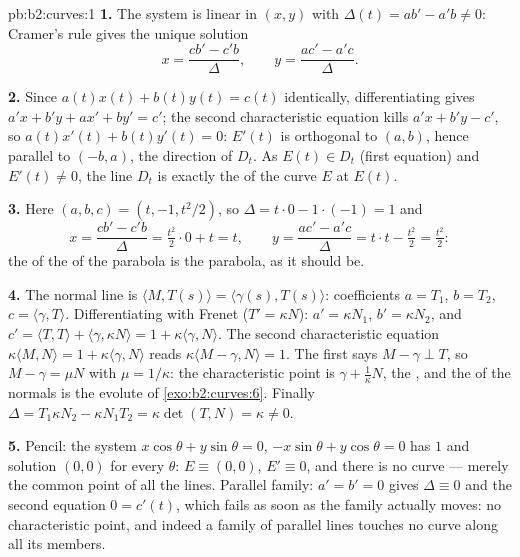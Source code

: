 \begin{solution}{pb:b2:curves:1}
\textbf{1.} The system is linear in $(x, y)$ with 
$\Delta(t) = a b' - a'b \neq 0$: Cramer's rule gives the
unique solution
\[
x = \frac{c b' - c' b}{\Delta}, \qquad
y = \frac{a c' - a' c}{\Delta}.
\]

\textbf{2.} Since $a(t)x(t) + b(t)y(t) = c(t)$ identically,
differentiating gives $a'x + b'y + ax' + by' = c'$; the
second characteristic equation kills $a'x + b'y - c'$, so
$a(t)x'(t) + b(t)y'(t) = 0$: $E'(t)$ is orthogonal to $(a,
b)$, hence parallel to $(-b, a)$, the direction of $D_t$. As
$E(t) \in D_t$ (first equation) and $E'(t) \neq 0$, the line
$D_t$ is exactly the  of the curve $E$ at $E(t)$.

\textbf{3.} Here $(a, b, c) = (t, -1, t^2/2)$, so $\Delta =
t\cdot0 - 1\cdot(-1) = 1$ and
\[
x = \frac{c b' - c' b}{\Delta} = \tfrac{t^2}2\cdot 0 +
t = t, \qquad
y = \frac{a c' - a' c}{\Delta} = t\cdot t - \tfrac{t^2}2 =
\tfrac{t^2}2 :
\]
the  of the  of the parabola is the
parabola, as it should be.

\textbf{4.} The normal line is $\langle M, T(s)\rangle =
\langle\gamma(s), T(s)\rangle$: coefficients $a = T_1$, $b =
T_2$, $c = \langle\gamma, T\rangle$. Differentiating with
Frenet ($T' = \kappa N$): $a' = \kappa N_1$, $b' = \kappa
N_2$, and $c' = \langle T, T\rangle + \langle\gamma, \kappa
N\rangle = 1 + \kappa\langle\gamma, N\rangle$. The second
characteristic equation $\kappa\langle M, N\rangle = 1 +
\kappa\langle\gamma, N\rangle$ reads $\kappa\langle M -
\gamma, N\rangle = 1$. The first says $M - \gamma \perp T$,
so $M - \gamma = \mu N$ with $\mu = 1/\kappa$: the
characteristic point is $\gamma + \frac1\kappa N$, the , and the  of the normals is the evolute
of \cref{exo:b2:curves:6}. Finally $\Delta = T_1\kappa N_2 -
\kappa N_1 T_2 = \kappa\det(T, N) = \kappa \neq 0$.

\textbf{5.} Pencil: the system $x\cos\theta + y\sin\theta =
0$, $-x\sin\theta + y\cos\theta = 0$ has  $1$ and
solution $(0,0)$ for every $\theta$: $E \equiv (0,0)$, $E'
\equiv 0$, and there is no curve --- merely the common point
of all the lines. Parallel family: $a' = b' = 0$ gives
$\Delta \equiv 0$ and the second equation $0 = c'(t)$, which
fails as soon as the family actually moves: no characteristic
point, and indeed a family of parallel lines touches no
curve along all its members.


\end{solution}

